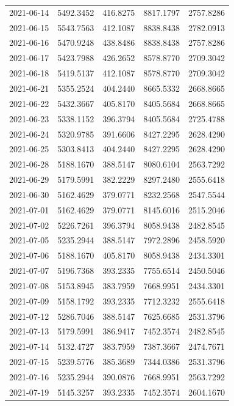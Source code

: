 {\begin{longtable}{lllll}
2021-06-14 & 5492.3452 & 416.8275 & 8817.1797 & 2757.8286 \\
2021-06-15 & 5543.7563 & 412.1087 & 8838.8438 & 2782.0913 \\
2021-06-16 & 5470.9248 & 438.8486 & 8838.8438 & 2757.8286 \\
2021-06-17 & 5423.7988 & 426.2652 & 8578.8770 & 2709.3042 \\
2021-06-18 & 5419.5137 & 412.1087 & 8578.8770 & 2709.3042 \\
2021-06-21 & 5355.2524 & 404.2440 & 8665.5332 & 2668.8665 \\
2021-06-22 & 5432.3667 & 405.8170 & 8405.5684 & 2668.8665 \\
2021-06-23 & 5338.1152 & 396.3794 & 8405.5684 & 2725.4788 \\
2021-06-24 & 5320.9785 & 391.6606 & 8427.2295 & 2628.4290 \\
2021-06-25 & 5303.8413 & 404.2440 & 8427.2295 & 2628.4290 \\
2021-06-28 & 5188.1670 & 388.5147 & 8080.6104 & 2563.7292 \\
2021-06-29 & 5179.5991 & 382.2229 & 8297.2480 & 2555.6418 \\
2021-06-30 & 5162.4629 & 379.0771 & 8232.2568 & 2547.5544 \\
2021-07-01 & 5162.4629 & 379.0771 & 8145.6016 & 2515.2046 \\
2021-07-02 & 5226.7261 & 396.3794 & 8058.9438 & 2482.8545 \\
2021-07-05 & 5235.2944 & 388.5147 & 7972.2896 & 2458.5920 \\
2021-07-06 & 5188.1670 & 405.8170 & 8058.9438 & 2434.3301 \\
2021-07-07 & 5196.7368 & 393.2335 & 7755.6514 & 2450.5046 \\
2021-07-08 & 5153.8945 & 383.7959 & 7668.9951 & 2434.3301 \\
2021-07-09 & 5158.1792 & 393.2335 & 7712.3232 & 2555.6418 \\
2021-07-12 & 5286.7046 & 388.5147 & 7625.6685 & 2531.3796 \\
2021-07-13 & 5179.5991 & 386.9417 & 7452.3574 & 2482.8545 \\
2021-07-14 & 5132.4727 & 383.7959 & 7387.3667 & 2474.7671 \\
2021-07-15 & 5239.5776 & 385.3689 & 7344.0386 & 2531.3796 \\
2021-07-16 & 5235.2944 & 390.0876 & 7668.9951 & 2563.7292 \\
2021-07-19 & 5145.3257 & 393.2335 & 7452.3574 & 2604.1670 \\

\end{longtable}}
